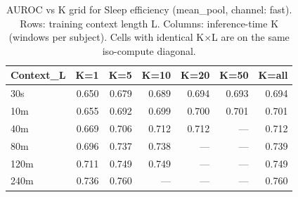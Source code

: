 \begin{table}[ht]
\centering
\caption{AUROC vs K grid for Sleep efficiency (mean_pool, channel: fast). Rows: training context length L. Columns: inference-time K (windows per subject). Cells with identical K×L are on the same iso-compute diagonal.}
\label{tab:kgrid_sleep_efficiency_binary_mean_pool_fast}
\begin{tabular}{lrrrrrr}
\toprule
Context_L & K=1 & K=5 & K=10 & K=20 & K=50 & K=all \\
\midrule
30s & 0.650 & 0.679 & 0.689 & 0.694 & 0.693 & 0.694 \\
10m & 0.655 & 0.692 & 0.699 & 0.700 & 0.701 & 0.701 \\
40m & 0.669 & 0.706 & 0.712 & 0.712 & — & 0.712 \\
80m & 0.696 & 0.737 & 0.738 & — & — & 0.739 \\
120m & 0.711 & 0.749 & 0.749 & — & — & 0.749 \\
240m & 0.736 & 0.760 & — & — & — & 0.760 \\
\bottomrule
\end{tabular}
\end{table}